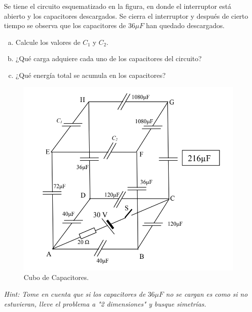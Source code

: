 \begin{mdframed}[style=warning]
	\begin{ejercicio}
		Se tiene el circuito esquematizado en la figura, en donde el interruptor está abierto y los capacitores descargados. Se cierra el interruptor y después de cierto tiempo se observa que los capacitores de $36\mu F$ han quedado descargados.
		\begin{enumerate}[a)]
			\item Calcule los valores de $C_1$ y $C_2$.
			\item ¿Qué carga adquiere cada uno de los capacitores del circuito?
			\item ¿Qué energía total se acumula en los capacitores?
		\end{enumerate}
		\begin{figure}[H]
			\centering
			\includegraphics[scale=0.3]{./img/cubo.png}
			\caption{Cubo de Capacitores.}
			\label{ej3}
		\end{figure}
		\textit{Hint: Tome en cuenta que si los capacitores de $36\mu F$ no se cargan es como si no estuvieran, lleve el problema a "2 dimensiones" y busque simetrías.}
	\end{ejercicio}
\end{mdframed}





